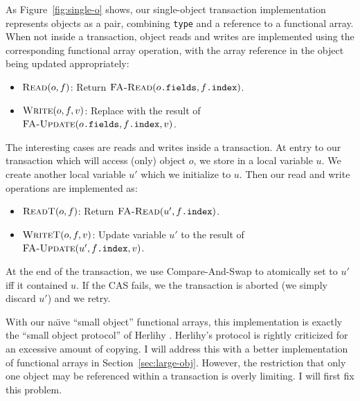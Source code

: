 As Figure~\ref{fig:single-o} shows, our single-object transaction
implementation represents objects as a pair, combining {\tt type} and a
reference to a functional array.  When not inside a transaction,
object reads and writes are implemented using the
corresponding functional array operation, with the array reference in
the object being updated appropriately:
\begin{itemize}
\item $\text{\sc Read}(o, f)$:
  Return $\text{\sc FA-Read}(o\text{\tt .fields}, f\text{\tt .index})$.
\item $\text{\sc Write}(o, f, v)$: Replace  with the
  result of \linebreak
  $\text{\sc FA-Update}(o\text{\tt .fields}, f\text{\tt .index}, v)$.
\end{itemize}

The interesting cases are reads and writes inside a transaction.
At entry to our transaction which will access (only) object $o$, we
store  in a local variable $u$.  We create another
local variable $u'$ which we initialize to $u$.  Then our read and
write operations are implemented as:
\begin{itemize}
\item $\text{\sc ReadT}(o, f)$:
  Return $\text{\sc FA-Read}(u', f\text{\tt .index})$.
\item $\text{\sc WriteT}(o, f, v)$:
  Update variable $u'$ to the result of \linebreak
  $\text{\sc FA-Update}(u', f\text{\tt .index}, v)$.
\end{itemize}

At the end of the transaction, we use Compare-And-Swap to atomically
set  to $u'$ iff it contained $u$.  If the CAS fails,
we the transaction is aborted (we simply discard $u'$) and we retry.

With our na{\"\i}ve ``small object'' functional arrays, this implementation is
exactly the ``small object protocol'' of Herlihy \cite{Herlihy93}.
Herlihy's protocol is rightly criticized for an excessive amount of
copying.  I will address this with a better implementation of
functional arrays in Section~\ref{sec:large-obj}.
However, the restriction that only one object
may be referenced within a transaction is overly limiting.  I will
first fix this problem.

